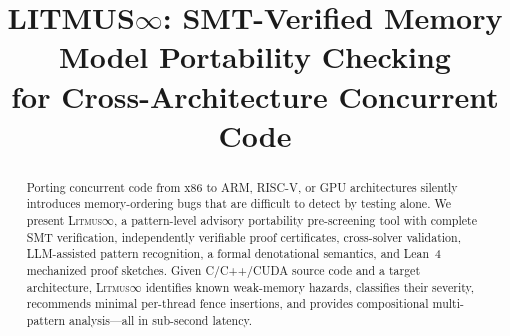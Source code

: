 \documentclass[11pt]{article}
\title{\textbf{LITMUS$\infty$: SMT-Verified Memory Model Portability Checking\\for Cross-Architecture Concurrent Code}}
\date{}
\newcommand{\litmus}{\textsc{Litmus$\infty$}}
\begin{document}
\maketitle

\begin{abstract}
Porting concurrent code from x86 to ARM, RISC-V, or GPU architectures
silently introduces memory-ordering bugs that are difficult to detect
by testing alone.  We present \litmus{}, a pattern-level advisory portability
pre-screening tool with complete SMT verification, independently
verifiable proof certificates, cross-solver validation, LLM-assisted
pattern recognition, a formal denotational semantics, and
Lean~4 mechanized proof sketches.  Given C/C++/CUDA source code
and a target architecture, \litmus{} identifies known weak-memory
hazards, classifies their severity, recommends minimal per-thread
fence insertions, and provides compositional multi-pattern analysis---all
in sub-second latency.


\end{abstract}
\end{document}
